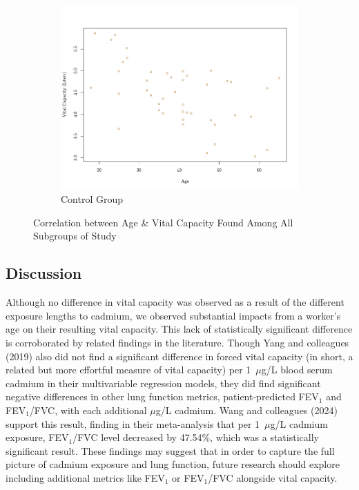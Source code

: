 \documentclass{article}
\begin{document}
\begin{figure}[h!]
			\hspace{0.05\textwidth}
			\begin{subfigure}[b]{0.3\textwidth}
				\includegraphics[width=\textwidth]{graphs/ScatterControl.png}
				\caption{Control Group}
				\label{fig:img3}
			\end{subfigure}
			\caption{Correlation between Age \& Vital Capacity Found Among All Subgroups of Study}
			\label{fig:three_images}
		\end{figure}

		\newpage

		\subsection*{Discussion}
		Although no difference in vital capacity was observed as a result of the different exposure lengths to cadmium, we observed substantial impacts from a worker’s age on their resulting vital capacity. This lack of statistically significant difference is corroborated by related findings in the literature. Though Yang and colleagues (2019) also did not find a significant difference in forced vital capacity (in short, a related but more effortful measure of vital capacity) per 1~\(\mu\)g/L blood serum cadmium in their multivariable regression models, they did find significant negative differences in other lung function metrics, patient-predicted FEV\(_1\) and FEV\(_1\)/FVC, with each additional \(\mu\)g/L cadmium. Wang and colleagues (2024) support this result, finding in their meta-analysis that per 1~\(\mu\)g/L cadmium exposure, FEV\(_1\)/FVC level decreased by 47.54\%, which was a statistically significant result. These findings may suggest that in order to capture the full picture of cadmium exposure and lung function, future research should explore including additional metrics like FEV\(_1\) or FEV\(_1\)/FVC alongside vital capacity.
\end{document}
